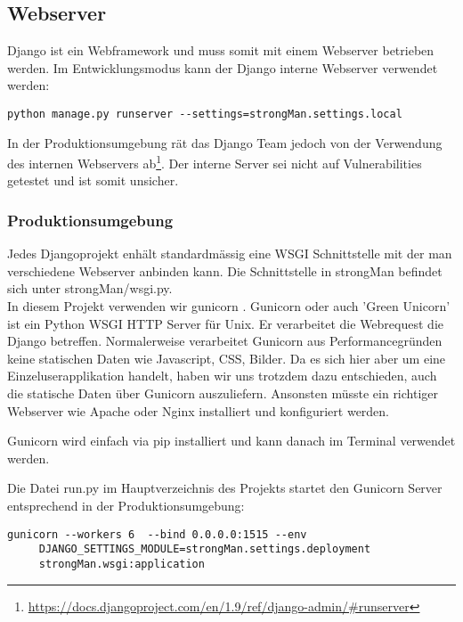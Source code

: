 \subsection{Webserver}
Django ist ein Webframework und muss somit mit einem Webserver betrieben werden.
Im Entwicklungsmodus kann der Django interne Webserver verwendet werden:
\begin{lstlisting}[style=BashInputStyle]
	 python manage.py runserver --settings=strongMan.settings.local
\end{lstlisting}

\medskip

In der Produktionsumgebung rät das Django Team jedoch von der Verwendung des internen Webservers ab\footnote{\url{https://docs.djangoproject.com/en/1.9/ref/django-admin/\#runserver}}. Der interne Server sei nicht auf Vulnerabilities getestet und ist somit unsicher.


\subsubsection{Produktionsumgebung}
Jedes Djangoprojekt enhält standardmässig eine WSGI \cite{wsgi} Schnittstelle mit der man verschiedene Webserver anbinden kann. Die Schnittstelle in strongMan befindet sich unter strongMan/wsgi.py. \\

 In diesem Projekt verwenden wir gunicorn \cite{gunicorn}. Gunicorn oder auch 'Green Unicorn' ist ein Python WSGI HTTP Server für Unix. Er verarbeitet die Webrequest die Django betreffen. Normalerweise verarbeitet Gunicorn aus Performancegründen keine statischen Daten wie Javascript, CSS, Bilder. Da es sich hier aber um eine Einzeluserapplikation handelt, haben wir uns trotzdem dazu entschieden, auch die statische Daten über Gunicorn auszuliefern. Ansonsten müsste ein richtiger Webserver wie Apache oder Nginx installiert und konfiguriert werden.

Gunicorn wird einfach via pip installiert und kann danach im Terminal verwendet werden.\\

\newpage

Die Datei run.py im Hauptverzeichnis des Projekts startet den Gunicorn Server entsprechend in der Produktionsumgebung:

\begin{lstlisting}[style=BashInputStyle]
	 gunicorn --workers 6  --bind 0.0.0.0:1515 --env
	 DJANGO_SETTINGS_MODULE=strongMan.settings.deployment 
	 strongMan.wsgi:application
\end{lstlisting}

